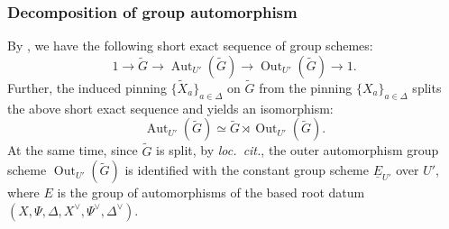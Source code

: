 \documentclass[11pt, reqno]{amsart}
\theoremstyle{plain}
\theoremstyle{definition}
\DeclareMathOperator{\Aut}{\mathrm{Aut}}		%
\DeclareMathOperator{\Out}{Out}	%
\begin{document}
\subsubsection{Decomposition of group automorphism}
By \cite[exposé~XXIV, théorème~1.3]{SGA3III}, we have the following short exact sequence of group schemes:
\begin{equation}\label{autogrpexactseq}
    1\longrightarrow \widetilde{G}\longrightarrow\Aut_{U'}(\widetilde{G})\longrightarrow\Out_{U'}(\widetilde{G})\longrightarrow 1.
\end{equation}
Further, the induced pinning $\{\widetilde{X}_a\}_{a\in\Delta}$ on $\widetilde{G}$ from the pinning $\{X_a\}_{a\in\Delta}$ splits the above short exact sequence and yields an isomorphism:
\begin{equation}\label{simdirectprodautogrp}
    \Aut_{U'}(\widetilde{G})\simeq \widetilde{G}\rtimes\Out_{U'}(\widetilde{G}).
\end{equation}
At the same time, since $\widetilde{G}$ is split, by \emph{loc.~cit.}, the outer automorphism group scheme $\Out_{U'}(\widetilde{G})$ is identified with the constant group scheme $\underline{E}_{U'}$ over $U'$, where $E$ is the group of automorphisms of the based root datum $(X,\Psi, \Delta, X^{\vee}, \Psi^{\vee}, \Delta^{\vee})$. 
\end{document}

